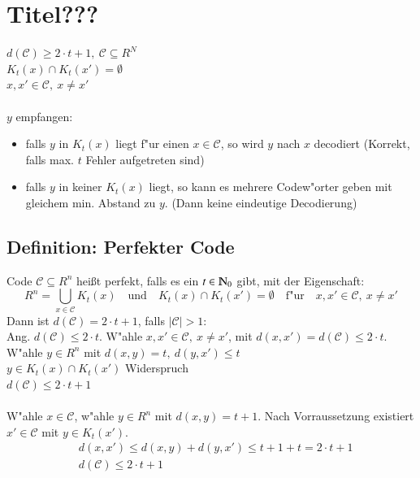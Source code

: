 \section{Titel???}

$d(\mathcal{C}) \geq 2 \cdot t + 1,\ \mathcal{C} \subseteq R^N$ \\
$K_t(x) \cap K_t(x')=\emptyset$ \\
$x, x' \in \mathcal{C},\ x \neq x'$ \\
\\
$y$ empfangen:
\begin{itemize}
\item falls $y$ in $K_t(x)$ liegt f"ur einen $x \in \mathcal{C}$, so wird $y$ nach $x$ decodiert (Korrekt, falls max. $t$ Fehler aufgetreten sind)
\item  falls $y$ in keiner $K_t(x)$ liegt, so kann es mehrere Codew"orter geben mit gleichem min. Abstand zu $y$. (Dann keine eindeutige  Decodierung)
\end{itemize}

\subsection{Definition: Perfekter Code}
Code $\mathcal{C} \subseteq R^n$ hei\ss t perfekt, falls es ein $t \in \N_0$ gibt, mit der Eigenschaft:
\[
	R^n = \bigcup_{x \in \mathcal{C}} K_t(x) \quad \text{und} \quad K_t(x) \cap K_t(x') = \emptyset \quad \text{f"ur}\quad x,x' \in \mathcal{C},\ x \neq x'
\]
Dann ist $d(\mathcal{C})=2 \cdot t + 1$, falls $\left| \mathcal{C} \right| > 1$: \\
Ang. $d(\mathcal{C}) \leq 2\cdot t$. W"ahle $x,x' \in \mathcal{C},\ x \neq x'$, mit $d(x,x') = d(\mathcal{C}) \leq 2 \cdot t$. \\
W"ahle $y \in R^n$ mit $d(x,y)=t,\ d(y,x') \leq t$\\
$y \in K_t(x) \cap K_t(x')$ Widerspruch\\
$d(\mathcal{C}) \leq 2 \cdot t + 1$ \\
\\
W"ahle $x \in \mathcal{C}$, w"ahle $y \in R^n$ mit $d(x,y)=t+1$. Nach Vorraussetzung existiert $x' \in \mathcal{C}$ mit $y \in K_t(x')$. 
\begin{align*}
	&d(x,x') \leq d(x,y) + d(y,x') \leq t+1+t = 2 \cdot t + 1 \\
	&d(\mathcal{C}) \leq 2\cdot t + 1
\end{align*}	

